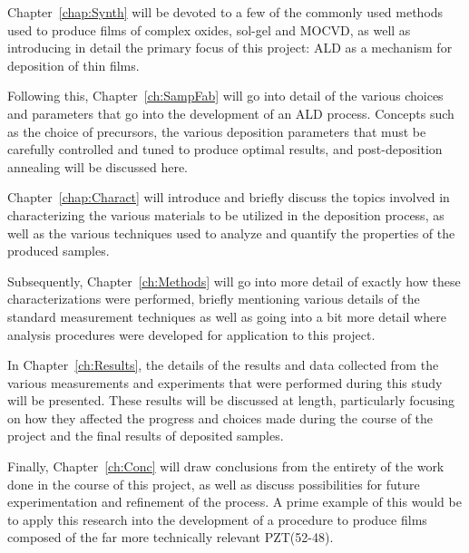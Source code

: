 Chapter~\ref{chap:Synth} will be devoted to a few of the commonly used methods used to produce films of complex oxides, sol-gel and MOCVD, as well as introducing in detail the primary focus of this project: ALD as a mechanism for deposition of thin films. 

Following this, Chapter~\ref{ch:SampFab} will go into detail of the various choices and parameters that go into the development of an ALD process. Concepts such as the choice of precursors, the various deposition parameters that must be carefully controlled and tuned to produce optimal results, and post-deposition annealing will be discussed here. 

Chapter~\ref{chap:Charact} will introduce and briefly discuss the topics involved in characterizing the various materials to be utilized in the deposition process, as well as the various techniques used to analyze and quantify the properties of the produced samples. 

Subsequently, Chapter~\ref{ch:Methods} will go into more detail of exactly how these characterizations were performed, briefly mentioning various details of the standard measurement techniques as well as going into a bit more detail where analysis procedures were developed for application to this project. 

In Chapter~\ref{ch:Results}, the details of the results and data collected from the various measurements and experiments that were performed during this study will be presented.  These results will be discussed at length, particularly focusing on how they affected the progress and choices made during the course of the project and the final results of deposited samples. 

Finally, Chapter~\ref{ch:Conc} will draw conclusions from the entirety of the work done in the course of this project, as well as discuss possibilities for future experimentation and refinement of the process. A prime example of this would be to apply this research into the development of a procedure to produce films composed of the far more technically relevant PZT(52-48). 


%
